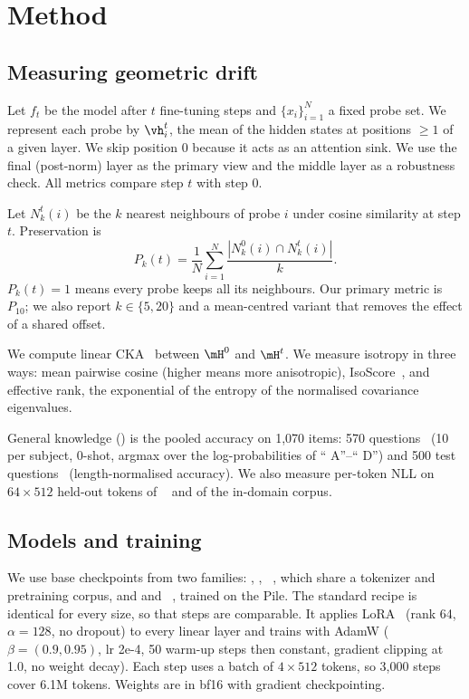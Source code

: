 \section{Method}
\label{sec:method}

\subsection{Measuring geometric drift}

Let $f_t$ be the model after $t$ fine-tuning steps and $\{x_i\}_{i=1}^{N}$ a fixed probe set. We represent each probe by $\vh_i^t$, the mean of the hidden states at positions $\geq 1$ of a given layer. We skip position 0 because it acts as an attention sink. We use the final (post-norm) layer as the primary view and the middle layer as a robustness check. All metrics compare step $t$ with step 0.

 Let $N_k^t(i)$ be the $k$ nearest neighbours of probe $i$ under cosine similarity at step $t$. Preservation is
\begin{equation}
    P_k(t) = \frac{1}{N}\sum_{i=1}^{N} \frac{|N_k^0(i)\cap N_k^t(i)|}{k}.
\end{equation}
$P_k(t)=1$ means every probe keeps all its neighbours. Our primary metric is $P_{10}$; we also report $k\in\{5,20\}$ and a mean-centred variant that removes the effect of a shared offset.

 We compute linear CKA~\citep{kornblith2019similarity} between $\mH^0$ and $\mH^t$. We measure isotropy in three ways: mean pairwise cosine (higher means more anisotropic), IsoScore~\citep{rudman2022isoscore}, and effective rank, the exponential of the entropy of the normalised covariance eigenvalues.

 General knowledge (\gk) is the pooled accuracy on 1,070 items: 570 \mmlu questions~\citep{hendrycks2021measuring} (10 per subject, 0-shot, argmax over the log-probabilities of `` A''--`` D'') and 500 \arce test questions~\citep{clark2018think} (length-normalised accuracy). We also measure per-token NLL on $64\times512$ held-out tokens of \wikitext~\citep{merity2016pointer} and of the in-domain corpus.

\subsection{Models and training}

We use base checkpoints from two families: \qwenS, \qwenM, \qwenL~\citep{qwen2024qwen25}, which share a tokenizer and pretraining corpus, and \pythiaS and \pythiaM~\citep{biderman2023pythia}, trained on the Pile. The standard recipe is identical for every size, so that steps are comparable. It applies LoRA~\citep{hu2022lora} (rank 64, $\alpha=128$, no dropout) to every linear layer and trains with AdamW ($\beta=(0.9,0.95)$, lr 2e-4, 50 warm-up steps then constant, gradient clipping at 1.0, no weight decay). Each step uses a batch of $4\times512$ tokens, so 3,000 steps cover 6.1M tokens. Weights are in bf16 with gradient checkpointing.

